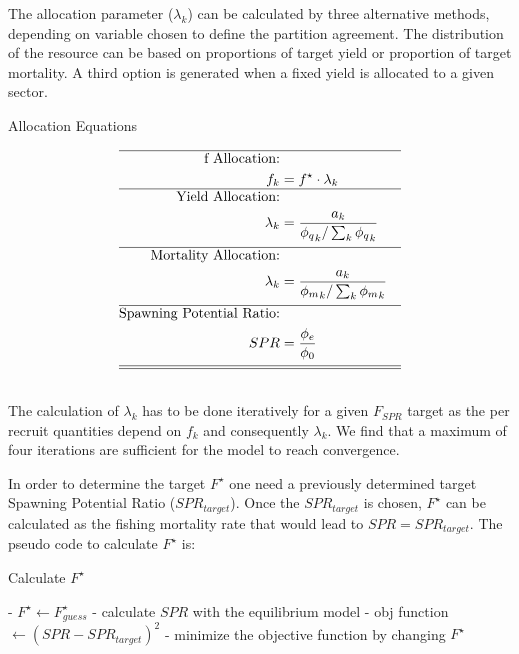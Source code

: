 \documentclass[12pt,letterpaper]{article}
\begin{document}
The allocation parameter ($\lambda_k$) can be calculated by three alternative methods, depending on variable chosen to define the partition agreement. The distribution of the resource can be based on proportions of target yield or proportion of target mortality. A third option is generated when a fixed yield is allocated to a given sector.


\begin{table}[h!]
\centering
\caption{Allocation Equations}\label{tab:allocation} 
\tableEq
	\large
    \begin{align}
    \hline
    	\mbox{f Allocation:} \nonumber \\
		        	f_{k} &=  f^{\star} \cdot \lambda_{k}  \label{T3.13}\\ 
		\hline        	
		\mbox{Yield Allocation:} \nonumber \\
					\lambda_k &= \dfrac{a_k}{{\phi_q}_k / \sum_k {\phi_q}_k } \label{T3.1}\\[1ex]
		\hline 
		\mbox{Mortality Allocation:} \nonumber \\
					\lambda_k &= \dfrac{a_k}{{\phi_m}_k / \sum_k {\phi_m}_k } \label{T3.2}\\[1ex]
		\hline 
		\mbox{Spawning Potential Ratio:} \nonumber \\
					SPR &= \dfrac{\phi_{e}}{\phi_{0}} \label{T3.3}\\[1ex]
\hline \hline \nonumber   
   \end{align}
\end{table}

The calculation of $\lambda_k$ has to be done iteratively for a given $F_{SPR}$ target as the per recruit quantities depend on $f_k$ and consequently $\lambda_k$. We find that a maximum of four iterations are sufficient for the model to reach convergence.  

In order to determine the target $F^{\star}$ one need a previously determined target Spawning Potential Ratio (${SPR}_{target}$). Once the ${SPR}_{target}$ is chosen, $F^{\star}$ can be calculated as the fishing mortality rate that would lead to $SPR = {SPR}_{target}$. The pseudo code to calculate $F^{\star}$ is: 


\begin{algorithm} 
\caption{Calculate $F^{\star}$}
\begin{algorithmic} 
\large
{} - $F^{\star} \leftarrow F^{\star}_{guess}$
 - calculate $SPR$ with the equilibrium model
 - obj function $\leftarrow (SPR-SPR_{target})^2$
 - minimize the objective function by changing $F^{\star}$
\end{algorithmic}
\end{algorithm}
\end{document}
